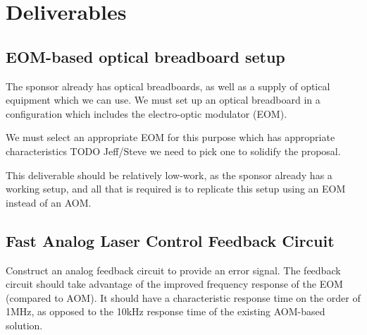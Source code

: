 \newpage
\section{Deliverables}

\subsection{EOM-based optical breadboard setup}

The sponsor already has optical breadboards, as well as a supply of optical equipment which we can use.  We must set up an optical breadboard in a configuration which includes the electro-optic modulator (EOM).

We must select an appropriate EOM for this purpose which has appropriate characteristics TODO Jeff/Steve we need to pick one to solidify the proposal.

This deliverable should be relatively low-work, as the sponsor already has a working setup, and all that is required is to replicate this setup using an EOM instead of an AOM.

\subsection{Fast Analog Laser Control Feedback Circuit}

Construct an analog feedback circuit to provide an error signal.  The feedback circuit should take advantage of the improved frequency response of the EOM (compared to AOM).  It should have a characteristic response time on the order of 1MHz, as opposed to the 10kHz response time of the existing AOM-based solution.

